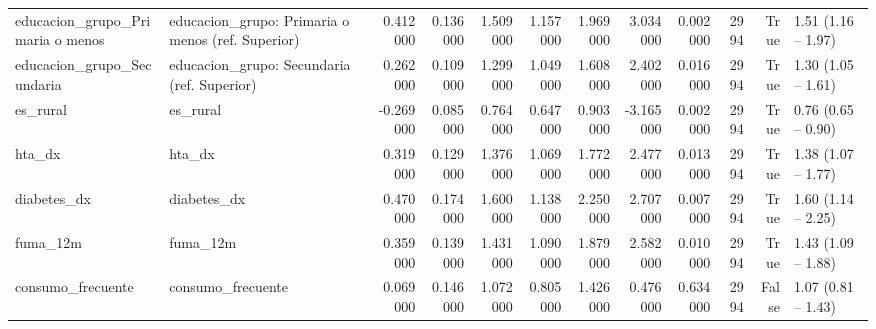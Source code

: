 \begin{table}[htbp]
\begin{tabular}{llrrrrrrrrrl}
educacion\_grupo\_Primaria o menos & educacion\_grupo: Primaria o menos (ref. Superior) & 0.412000 & 0.136000 & 1.509000 & 1.157000 & 1.969000 & 3.034000 & 0.002000 & 2994 & True & 1.51 (1.16 – 1.97) \\
educacion\_grupo\_Secundaria & educacion\_grupo: Secundaria (ref. Superior) & 0.262000 & 0.109000 & 1.299000 & 1.049000 & 1.608000 & 2.402000 & 0.016000 & 2994 & True & 1.30 (1.05 – 1.61) \\
es\_rural & es\_rural & -0.269000 & 0.085000 & 0.764000 & 0.647000 & 0.903000 & -3.165000 & 0.002000 & 2994 & True & 0.76 (0.65 – 0.90) \\
hta\_dx & hta\_dx & 0.319000 & 0.129000 & 1.376000 & 1.069000 & 1.772000 & 2.477000 & 0.013000 & 2994 & True & 1.38 (1.07 – 1.77) \\
diabetes\_dx & diabetes\_dx & 0.470000 & 0.174000 & 1.600000 & 1.138000 & 2.250000 & 2.707000 & 0.007000 & 2994 & True & 1.60 (1.14 – 2.25) \\
fuma\_12m & fuma\_12m & 0.359000 & 0.139000 & 1.431000 & 1.090000 & 1.879000 & 2.582000 & 0.010000 & 2994 & True & 1.43 (1.09 – 1.88) \\
consumo\_frecuente & consumo\_frecuente & 0.069000 & 0.146000 & 1.072000 & 0.805000 & 1.426000 & 0.476000 & 0.634000 & 2994 & False & 1.07 (0.81 – 1.43) \\
\bottomrule
\end{tabular}
\end{table}
